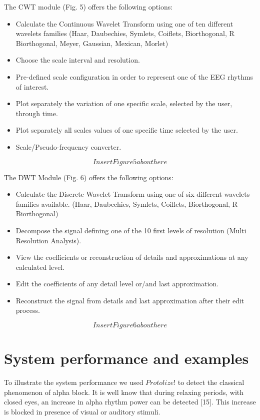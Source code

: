\documentclass[12pt, a4paper]{article}
\begin{document}
The CWT module (Fig. 5) offers the following options:
\begin{itemize}
\item Calculate the Continuous Wavelet Transform using one of ten different wavelets families (Haar, Daubechies, Symlets, Coiflets, Biorthogonal, R Biorthogonal, Meyer, Gaussian, Mexican, Morlet)
\item Choose the scale interval and resolution.
\item Pre-defined scale configuration in order to represent one of the EEG rhythms of interest. 
\item Plot separately the variation of one specific scale, selected by the user, through time.
\item Plot separately all scales values of one specific time selected by the user.
\item Scale/Pseudo-frequency converter.
\end{itemize}
$$Insert Figure 5 about here$$


The DWT Module (Fig. 6) offers the following options:
\begin{itemize}
\item Calculate the Discrete Wavelet Transform using one of six different wavelets families available. (Haar, Daubechies, Symlets, Coiflets, Biorthogonal, R Biorthogonal)
\item Decompose the signal defining one of the 10 first levels of resolution (Multi Resolution Analysis). 
\item View the coefficients or reconstruction of details and approximations at any calculated level. 
\item Edit the coefficients of any detail level or/and last approximation. 
\item Reconstruct the signal from details and last approximation after their edit process.
\end{itemize}
$$Insert Figure 6 about here$$

\section{System performance and examples}

To illustrate the system performance we used $Protolize!$ to detect the classical phenomenon of alpha block.  It is well know that during relaxing periods, with closed eyes, an increase in alpha rhythm power can be detected [15]. This increase is blocked in presence of visual or auditory stimuli. 
\end{document}
